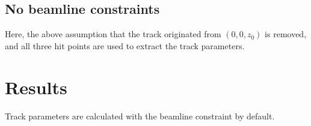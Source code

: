 \documentclass[a4paper, 12pt]{article}
\begin{document}
\subsection{No beamline constraints}
Here, the above assumption that the track originated from $(0, 0, z_0)$ is removed, and all three hit points are used to extract the track parameters. 

\section{Results} 
Track parameters are calculated with the beamline constraint by default.
\end{document}
